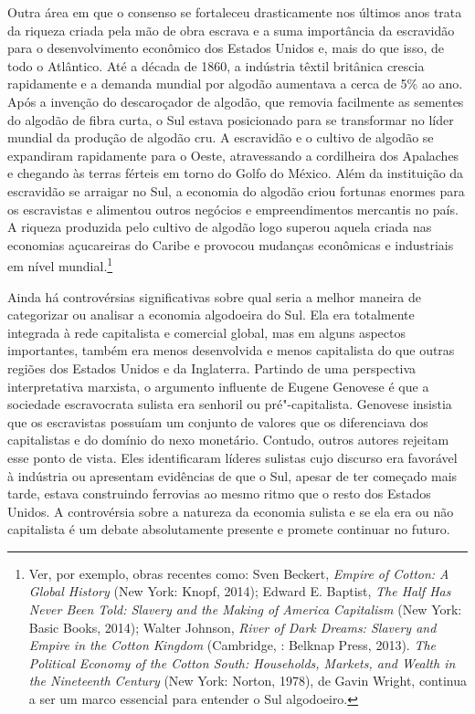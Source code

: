 Outra área em que o consenso se fortaleceu drasticamente nos últimos
anos trata da riqueza criada pela mão de obra escrava e a suma
importância da escravidão para o desenvolvimento econômico dos Estados
Unidos e, mais do que isso, de todo o Atlântico. Até a década de 1860, a
indústria têxtil britânica crescia rapidamente e a demanda mundial por
algodão aumentava a cerca de 5\% ao ano. Após a invenção do descaroçador
de algodão, que removia facilmente as sementes do algodão de fibra
curta, o Sul estava posicionado para se transformar no líder mundial da
produção de algodão cru. A escravidão e o cultivo de algodão se
expandiram rapidamente para o Oeste, atravessando a cordilheira dos
Apalaches e chegando às terras férteis em torno do Golfo do México. Além
da instituição da escravidão se arraigar no Sul, a economia do algodão
criou fortunas enormes para os escravistas e alimentou outros negócios e
empreendimentos mercantis no país. A riqueza produzida pelo cultivo de
algodão logo superou aquela criada nas economias açucareiras do Caribe e
provocou mudanças econômicas e industriais em nível mundial.\footnote{Ver,
  por exemplo, obras recentes como: Sven Beckert, \emph{Empire of
  Cotton: A Global History} (New York: Knopf, 2014); Edward E. Baptist,
  \emph{The Half Has Never Been Told: Slavery and the Making of America
  Capitalism} (New York: Basic Books, 2014); Walter Johnson, \emph{River
  of Dark Dreams: Slavery and Empire in the Cotton Kingdom} (Cambridge,
  : Belknap Press, 2013). \emph{The Political Economy of the Cotton
  South: Households, Markets, and Wealth in the Nineteenth Century} (New
  York: Norton, 1978), de Gavin Wright, continua a ser um marco
  essencial para entender o Sul algodoeiro.}

Ainda há controvérsias significativas sobre qual seria a melhor maneira
de categorizar ou analisar a economia algodoeira do Sul. Ela era
totalmente integrada à rede capitalista e comercial global, mas em
alguns aspectos importantes, também era menos desenvolvida e menos
capitalista do que outras regiões dos Estados Unidos e da Inglaterra.
Partindo de uma perspectiva interpretativa marxista, o argumento
influente de Eugene Genovese é que a sociedade escravocrata sulista era
senhoril ou pré"-capitalista. Genovese insistia que os escravistas
possuíam um conjunto de valores que os diferenciava dos capitalistas e
do domínio do nexo monetário. Contudo, outros autores rejeitam esse
ponto de vista. Eles identificaram líderes sulistas cujo discurso era
favorável à indústria ou apresentam evidências de que o Sul, apesar de
ter começado mais tarde, estava construindo ferrovias ao mesmo ritmo que
o resto dos Estados Unidos. A controvérsia sobre a natureza da economia
sulista e se ela era ou não capitalista é um debate absolutamente
presente e promete continuar no futuro.

